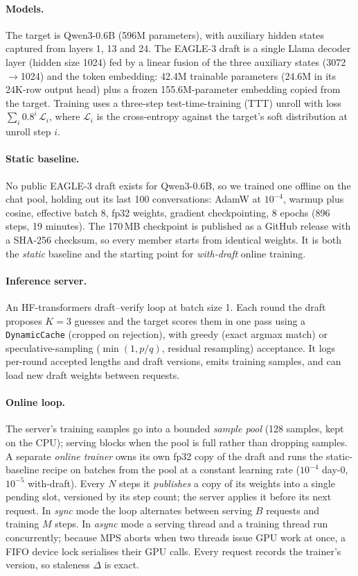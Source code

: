 \documentclass[11pt]{article}
\newcommand{\code}[1]{\texttt{\small #1}}
\begin{document}
\paragraph{Models.} The target is Qwen3-0.6B (596M parameters), with auxiliary hidden states captured from layers
1, 13 and 24. The EAGLE-3 draft is a single Llama decoder layer (hidden size 1024) fed by a linear fusion of the
three auxiliary states (3072$\to$1024) and the token embedding: 42.4M trainable parameters (24.6M in its 24K-row
output head) plus a frozen 155.6M-parameter embedding copied from the target. Training uses a three-step
test-time-training (TTT) unroll with loss $\sum_i 0.8^i\,\mathcal{L}_i$, where $\mathcal{L}_i$ is the
cross-entropy against the target's soft distribution at unroll step $i$.

\paragraph{Static baseline.} No public EAGLE-3 draft exists for Qwen3-0.6B, so we trained one offline on the chat
pool, holding out its last 100 conversations: AdamW at $10^{-4}$, warmup plus cosine, effective batch 8, fp32
weights, gradient checkpointing, 8 epochs (896 steps, 19 minutes). The 170\,MB checkpoint is published as a
GitHub release with a SHA-256 checksum, so every member starts from identical weights. It is both the
\emph{static} baseline and the starting point for \emph{with-draft} online training.

\paragraph{Inference server.} An HF-transformers draft--verify loop at batch size 1. Each round the draft proposes
$K=3$ guesses and the target scores them in one pass using a \code{DynamicCache} (cropped on rejection), with
greedy (exact argmax match) or speculative-sampling ($\min(1,p/q)$, residual resampling) acceptance. It logs
per-round accepted lengths and draft versions, emits training samples, and can load new draft weights between
requests.

\paragraph{Online loop.} The server's training samples go into a bounded \emph{sample pool} (128 samples, kept on
the CPU); serving blocks when the pool is full rather than dropping samples. A separate \emph{online trainer} owns
its own fp32 copy of the draft and runs the static-baseline recipe on batches from the pool at a constant learning
rate ($10^{-4}$ day-0, $10^{-5}$ with-draft). Every $N$ steps it \emph{publishes} a copy of its weights into a
single pending slot, versioned by its step count; the server applies it before its next request. In \emph{sync}
mode the loop alternates between serving $B$ requests and training $M$ steps. In \emph{async} mode a serving
thread and a training thread run concurrently; because MPS aborts when two threads issue GPU work at once, a FIFO
device lock serialises their GPU calls. Every request records the trainer's version, so staleness $\Delta$ is exact.
\end{document}
